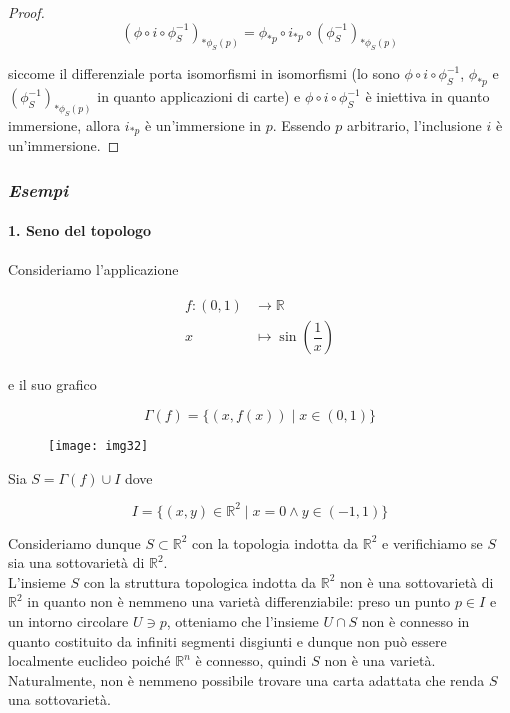 \begin{proof}
	\begin{equation}
		(\phi \circ i \circ \phi_{S}^{-1})_{*\phi_{S}(p)} = \phi_{*p} \circ i_{*p} \circ (\phi_{S}^{-1})_{*\phi_{S}(p)}
	\end{equation}

	siccome il differenziale porta isomorfismi in isomorfismi (lo sono $ \phi \circ i \circ \phi_{S}^{-1} $, $ \phi_{*p} $ e $ (\phi_{S}^{-1})_{*\phi_{S}(p)} $ in quanto applicazioni di carte) e $ \phi \circ i \circ \phi_{S}^{-1} $ è iniettiva in quanto immersione, allora $ i_{*p} $ è un'immersione in $ p $. Essendo $ p $ arbitrario, l'inclusione $ i $ è un'immersione.
\end{proof}

\subsubsection{\textit{Esempi}}

\paragraph{1. Seno del topologo}

Consideriamo l'applicazione

\begin{align}
	\begin{split}
		f : (0,1) &\to \mathbb{R}\\
		x &\mapsto \sin(\dfrac{1}{x})
	\end{split}
\end{align}

e il suo grafico

\begin{equation}
	\Gamma(f) = \{ (x,f(x)) \mid x \in (0,1) \}
\end{equation}

\begin{figure}[H]
	\centering
	\texttt{[image: img32]}
\end{figure}

Sia $ S = \Gamma(f) \cup I $ dove

\begin{equation}
	I = \{ (x,y) \in \mathbb{R}^{2} \mid x=0 \wedge y \in (-1,1) \}
\end{equation}

Consideriamo dunque $ S \subset \mathbb{R}^{2} $ con la topologia indotta da $ \mathbb{R}^{2} $ e verifichiamo se $ S $ sia una sottovarietà di $ \mathbb{R}^{2} $.\\
L'insieme $ S $ con la struttura topologica indotta da $ \mathbb{R}^{2} $ non è una sottovarietà di $ \mathbb{R}^{2} $ in quanto non è nemmeno una varietà differenziabile: preso un punto $ p \in I $ e un intorno circolare $ U \ni p $, otteniamo che l'insieme $ U \cap S $ non è connesso in quanto costituito da infiniti segmenti disgiunti e dunque non può essere localmente euclideo poiché $ \mathbb{R}^{n} $ è connesso, quindi $ S $ non è una varietà.\\
Naturalmente, non è nemmeno possibile trovare una carta adattata che renda $ S $ una sottovarietà.

